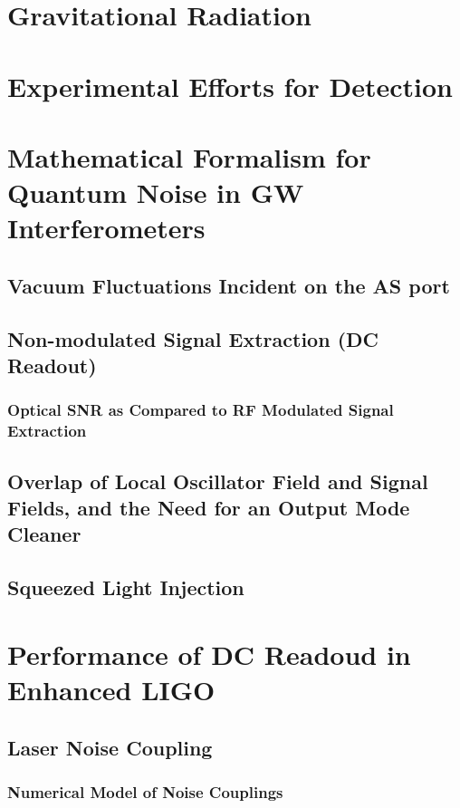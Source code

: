 \documentclass[12pt,vi,twoside]{mitthesis}
\begin{document}

\pagestyle{plain}

%


\chapter{Gravitational Radiation}

\chapter{Experimental Efforts for Detection}

\chapter{Mathematical Formalism for Quantum Noise in GW Interferometers}
\section{Vacuum Fluctuations Incident on the AS port}
\section{Non-modulated Signal Extraction (DC Readout)}
\subsection{Optical SNR as Compared to RF Modulated Signal Extraction}
\section{Overlap of Local Oscillator Field and Signal Fields, and the Need for an Output Mode Cleaner}
\section{Squeezed Light Injection}

\chapter{Performance of DC Readoud in Enhanced LIGO}
\section{Laser Noise Coupling}
\subsection{Numerical Model of Noise Couplings}
\end{document}
